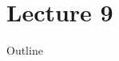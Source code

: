 \documentclass{beamer}
\begin{document}
\part{Lecture 9}

\begin{frame}
\titlepage
    \resetonslide
\end{frame}







\begin{frame}{Outline}
	\tableofcontents[part=9]
\end{frame}
\end{document}
